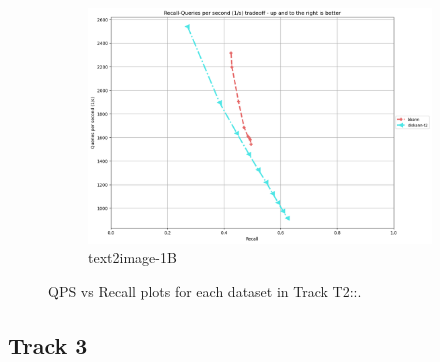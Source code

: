 \begin{figure}[ht]
\begin{subfigure}{0.48\textwidth}
    \includegraphics[width=\linewidth]{../t1_t2/results/T2/neurips21/text2image-1B.png}
    \caption{text2image-1B}
  \end{subfigure}
      
  \caption{QPS vs Recall plots for each dataset in Track T2::.}

\end{figure}

\fi 

\subsection{Track 3}

